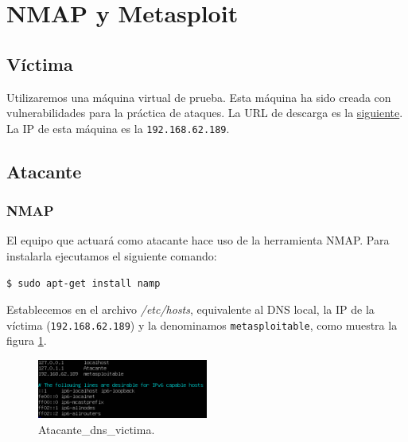 \documentclass[a4,12pt,onecolum]{article}
\begin{document}

\clearpage
\section{NMAP y Metasploit}

\subsection{Víctima}
Utilizaremos una máquina virtual de prueba. Esta máquina ha sido creada con vulnerabilidades para la práctica de ataques. La URL de descarga es la \href{wiki.inf.um.es/metasploitable2/metasploitable-linux-2.0.0.zip}{siguiente}. \\

La IP de esta máquina es la \texttt{192.168.62.189}.

\subsection{Atacante}

\subsubsection{NMAP}

El equipo que actuará como atacante hace uso de la herramienta NMAP. Para instalarla ejecutamos el siguiente comando:

\begin{verbatim}
$ sudo apt-get install namp
\end{verbatim}

Establecemos en el archivo \emph{/etc/hosts}, equivalente al DNS local, la IP de la víctima (\texttt{192.168.62.189}) y la denominamos \texttt{metasploitable}, como muestra la figura \ref{fig:nmap1}. \\

\begin{figure}[htbp]
\centering
\includegraphics[width=0.5\textwidth]{./images/Atacante_dns_victima.png}
\caption{Atacante\_dns\_victima.}
\label{fig:nmap1}
\end{figure}
\end{document}
